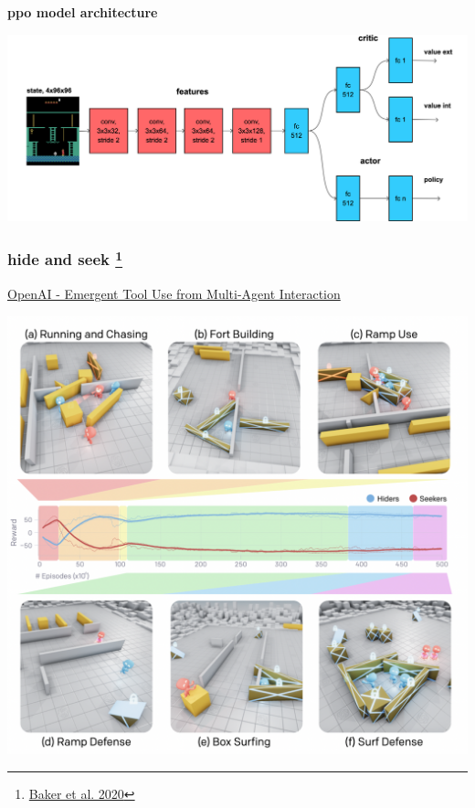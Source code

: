 \documentclass{beamer}
\begin{document}
  \begin{frame}{\bf ppo model architecture}

  \centering
  \includegraphics[scale=0.12]{../diagrams/rnd/modelppoc.png}
    
  \end{frame}
  
  
  
  

















\begin{frame}
  
  \frametitle{hide and seek \footnote{\href{https://arxiv.org/pdf/1909.07528.pdf}{Baker et al. 2020}}}
  \href{https://openai.com/blog/emergent-tool-use/}{OpenAI - Emergent Tool Use from Multi-Agent Interaction}

  \includegraphics[scale=0.3]{../images/hide_and_seek.png}

\end{frame}
\end{document}
